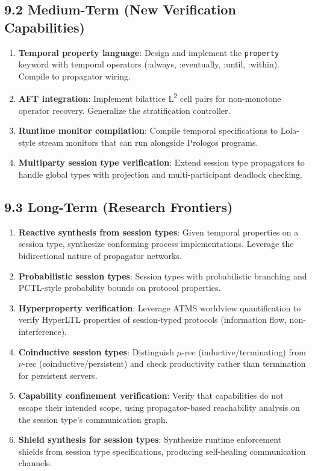 \documentclass[11pt]{article}
\begin{document}
\subsection{9.2 Medium-Term (New Verification Capabilities)}
\label{sec:org936b696}

\begin{enumerate}
\item \textbf{Temporal property language}: Design and implement the \texttt{property} keyword
with temporal operators (:always, :eventually, :until, :within). Compile to
propagator wiring.

\item \textbf{AFT integration}: Implement bilattice L\textsuperscript{2} cell pairs for non-monotone
operator recovery. Generalize the stratification controller.

\item \textbf{Runtime monitor compilation}: Compile temporal specifications to Lola-style
stream monitors that can run alongside Prologos programs.

\item \textbf{Multiparty session type verification}: Extend session type propagators to
handle global types with projection and multi-participant deadlock checking.
\end{enumerate}
\subsection{9.3 Long-Term (Research Frontiers)}
\label{sec:org41d061b}

\begin{enumerate}
\item \textbf{Reactive synthesis from session types}: Given temporal properties on a
session type, synthesize conforming process implementations. Leverage the
bidirectional nature of propagator networks.

\item \textbf{Probabilistic session types}: Session types with probabilistic branching
and PCTL-style probability bounds on protocol properties.

\item \textbf{Hyperproperty verification}: Leverage ATMS worldview quantification
to verify HyperLTL properties of session-typed protocols (information
flow, non-interference).

\item \textbf{Coinductive session types}: Distinguish \(\mu\)-rec (inductive/terminating)
from \(\nu\)-rec (coinductive/persistent) and check productivity rather than
termination for persistent servers.

\item \textbf{Capability confinement verification}: Verify that capabilities do not
escape their intended scope, using propagator-based reachability analysis
on the session type's communication graph.

\item \textbf{Shield synthesis for session types}: Synthesize runtime enforcement
shields from session type specifications, producing self-healing
communication channels.
\end{enumerate}
\end{document}
